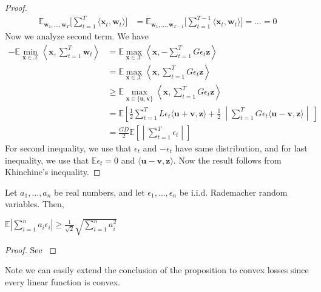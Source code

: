 \documentclass[12pt, a4paper]{report}
\begin{document}
\begin{proof}
\begin{align*}
    \mathbb{E}_{\mathbf{w}_1, \dots, \mathbf{w}_T} \Big[\sum_{t=1}^T \langle\mathbf{x}_t, \mathbf{w}_t\rangle\Big] &= \mathbb{E}_{\mathbf{w}_1, \dots, \mathbf{w}_{T-1}} \Big[\sum_{t=1}^{T-1} \langle\mathbf{x}_t, \mathbf{w}_t\rangle\Big]
    = \dots = 0
\end{align*}
Now we analyze second term. We have
\begin{align*}
    -\mathbb{E} \min_{\mathbf{x} \in \mathcal{X}} \left\langle \mathbf{x}, \sum_{t=1}^T \mathbf{w}_t \right\rangle &= 
    \mathbb{E} \max_{\mathbf{x} \in \mathcal{X}} \left\langle \mathbf{x}, -\sum_{t=1}^T G\epsilon_t\mathbf{z} \right\rangle \nonumber
    \\
    &= \mathbb{E} \max_{\mathbf{x} \in \mathcal{X}} \left\langle \mathbf{x}, \sum_{t=1}^T G\epsilon_t \mathbf{z} \right\rangle \nonumber
    \\
    &\geq \mathbb{E} \max_{\mathbf{x} \in \{\mathbf{u}, \mathbf{v}\}} \left\langle \mathbf{x}, \sum_{t=1}^T G\epsilon_t\mathbf{z} \right\rangle \nonumber
    \\
    &= \mathbb{E} \left[\frac{1}{2}\sum_{t=1}^T L\epsilon_t \langle \mathbf{u} + \mathbf{v}, \mathbf{z} \rangle + \frac{1}{2}\ \middle| \sum_{t=1}^T G\epsilon_t \langle \mathbf{u} -\mathbf{v}, \mathbf{z} \rangle \middle|\ \right]
    \\
    &= \frac{GD}{2} \mathbb{E} \left[\middle| \sum_{t=1}^T \epsilon_t \middle| \right] \nonumber
\end{align*}
For second inequality, we use that $\epsilon_t$ and $-\epsilon_t$ have same distribution, and for last inequality, we use that $\mathbb{E} \epsilon_t = 0$ and $\langle \mathbf{u} -\mathbf{v}, \mathbf{z} \rangle$. Now the result follows from Khinchine's inequality.
\end{proof}
\begin{lem}
Let $a_1, \dots, a_n$ be real numbers, and let $\epsilon_1, \dots, \epsilon_n$ be i.i.d. Rademacher random variables. Then,
\begin{center}
    $\displaystyle \mathbb{E}\left|\sum_{i=1}^n a_i\epsilon_i\right| \geq \frac{1}{\sqrt{2}}\sqrt{\sum_{i=1}^n a_i^2}$
\end{center}
\end{lem}
\begin{proof}
See \cite[Lemma~8.2]{CesaBianchi2006PredictionLA}
\end{proof}

Note we can easily extend the conclusion of the proposition to convex losses since every linear function is convex. 
\end{document}
